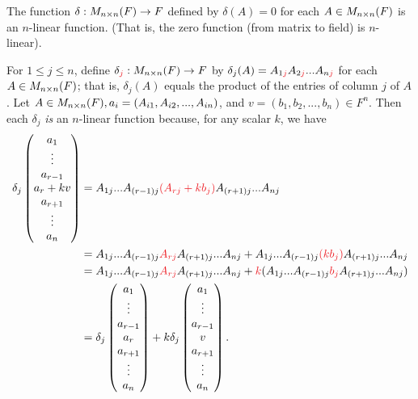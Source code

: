 \begin{example} \label{example 4.5.1}
The function \(\delta: M_{n \times n}(F) \to F\) defined by \(\delta(A) = 0\) for each \(A \in M_{n \times n}(F)\) is an \(n\)-linear function.
(That is, the zero function (from matrix to field) is \(n\)-linear).
\end{example}

\begin{example} \label{example 4.5.2}
For \(1 \le j \le n\), define \(\delta_{\RED{j}}: M_{n \X n}(F) \to F\) by \(\delta_j(A) = A_{1\RED{j}} A_{2\RED{j}} ... A_{n\RED{j}}\) for each \(A \in M_{n \times n}(F)\);
that is, \(\delta_j(A)\) equals the product of the entries of column \(j\) of \(A\).
Let \(A \in M_{n \times n}(F), a_i = (A_{i1}, A_{i2}, ..., A_{in})\), and \(v = (b_1, b_2, ..., b_n) \in F^n\).
Then each \(\delta_j\) \emph{is} an \(n\)-linear function because, for any scalar \(k\), we have
\begin{align*}
    \delta_j \begin{pmatrix} a_1 \\ \vdots \\ a_{r - 1} \\ a_r + kv \\ a_{r + 1} \\ \vdots \\ a_n \end{pmatrix}
        & = A_{1j} ... A_{(r-1)j} \RED{(A_{rj} + k b_j)} A_{(r+1)j} ... A_{nj} \\
        & = A_{1j} ... A_{(r-1)j} \RED{A_{rj}} A_{(r+1)j} ... A_{nj} + A_{1j} ... A_{(r-1)j} \RED{(k b_j)} A_{(r+1)j} ... A_{nj} \\
        & = A_{1j} ... A_{(r-1)j} \RED{A_{rj}} A_{(r+1)j} ... A_{nj} + \RED{k}(A_{1j} ... A_{(r-1)j} \RED{b_j} A_{(r+1)j} ... A_{nj}) \\
        & = \delta_j \begin{pmatrix} a_1 \\ \vdots \\ a_{r - 1} \\ a_r \\ a_{r + 1} \\ \vdots \\ a_n \end{pmatrix}
          + k \delta_j \begin{pmatrix} a_1 \\ \vdots \\ a_{r - 1} \\ v \\ a_{r + 1} \\ \vdots \\ a_n \end{pmatrix}.
\end{align*}
\end{example}

